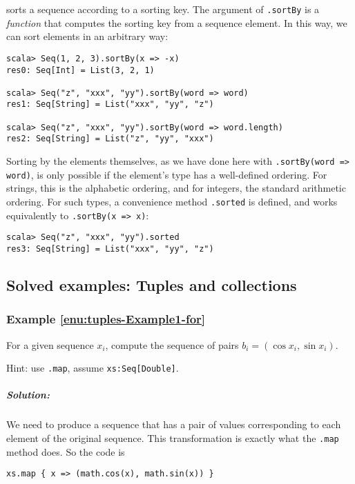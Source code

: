sorts a sequence according to a sorting key. The argument of \lstinline!.sortBy!
is a \emph{function} that computes the sorting key from a sequence
element. In this way, we can sort elements in an arbitrary way:
\begin{lstlisting}
scala> Seq(1, 2, 3).sortBy(x => -x)
res0: Seq[Int] = List(3, 2, 1)

scala> Seq("z", "xxx", "yy").sortBy(word => word)
res1: Seq[String] = List("xxx", "yy", "z")

scala> Seq("z", "xxx", "yy").sortBy(word => word.length)
res2: Seq[String] = List("z", "yy", "xxx")
\end{lstlisting}
Sorting by the elements themselves, as we have done here with \lstinline!.sortBy(word => word)!,
is only possible if the element's type has a well-defined ordering.
For strings, this is the alphabetic ordering, and for integers, the
standard arithmetic ordering. For such types, a convenience method
\lstinline!.sorted! is
defined, and works equivalently to \lstinline!.sortBy(x => x)!:
\begin{lstlisting}
scala> Seq("z", "xxx", "yy").sorted
res3: Seq[String] = List("xxx", "yy", "z")
\end{lstlisting}

\subsection{Solved examples: Tuples and collections}

\subsubsection{Example \label{enu:tuples-Example1-for}\ref{enu:tuples-Example1-for}}

For a given sequence $x_{i}$, compute the sequence of pairs $b_{i}=\left(\cos x_{i},\sin x_{i}\right)$.

Hint: use \lstinline!.map!,
assume \lstinline!xs:Seq[Double]!.

\subparagraph{Solution: }

We need to produce a sequence that has a pair of values corresponding
to each element of the original sequence. This transformation is exactly
what the \lstinline!.map!
method does. So the code is
\begin{lstlisting}
xs.map { x => (math.cos(x), math.sin(x)) }
\end{lstlisting}

